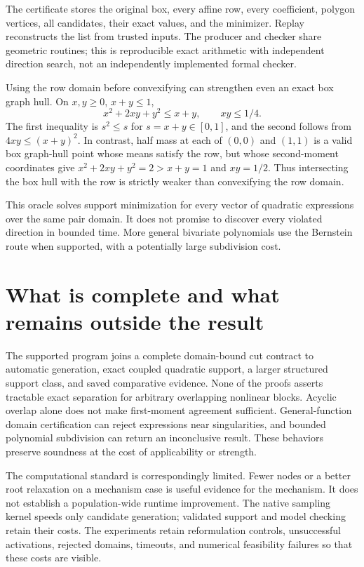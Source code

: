 \documentclass[11pt]{article}
\theoremstyle{definition}
\theoremstyle{remark}
\begin{document}
The certificate stores the original box, every affine row, every
coefficient, polygon vertices, all candidates, their exact values, and
the minimizer. Replay reconstructs the list from trusted inputs. The
producer and checker share geometric routines; this is reproducible
exact arithmetic with independent direction search, not an
independently implemented formal checker.

Using the row domain before convexifying can strengthen even an exact
box graph hull. On $x,y\ge0$, $x+y\le1$,
\[
x^2+2xy+y^2\le x+y,\qquad xy\le1/4.
\]
The first inequality is $s^2\le s$ for $s=x+y\in[0,1]$, and the
second follows from $4xy\le(x+y)^2$. In contrast, half mass at each
of $(0,0)$ and $(1,1)$ is a valid box graph-hull point whose means
satisfy the row, but whose second-moment coordinates give
$x^2+2xy+y^2=2>x+y=1$ and $xy=1/2$. Thus intersecting the box hull
with the row is strictly weaker than convexifying the row domain.

This oracle solves support minimization for every vector of quadratic
expressions over the same pair domain. It does not promise to discover
every violated direction in bounded time. More general bivariate
polynomials use the Bernstein route when supported, with a potentially
large subdivision cost.







\section{What is complete and what remains outside the result}\label{sec:limits}

The supported program joins a complete domain-bound cut contract to
automatic generation, exact coupled quadratic support, a larger
structured support class, and saved comparative evidence. None of the
proofs asserts tractable exact separation for arbitrary overlapping
nonlinear blocks. Acyclic overlap alone does not make first-moment
agreement sufficient. General-function domain certification can reject
expressions near singularities, and bounded polynomial subdivision can
return an inconclusive result. These behaviors preserve soundness at
the cost of applicability or strength.

The computational standard is correspondingly limited. Fewer nodes or
a better root relaxation on a mechanism case is useful evidence for the
mechanism. It does not establish a population-wide runtime improvement.
The native sampling kernel speeds only candidate generation; validated
support and model checking retain their costs. The experiments retain
reformulation controls, unsuccessful activations, rejected domains,
timeouts, and numerical feasibility failures so that these costs are
visible.
\end{document}
